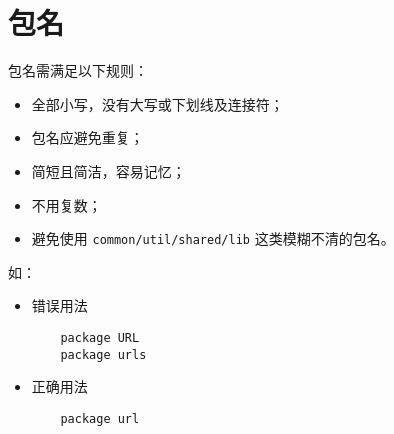 \section{包名}
包名需满足以下规则：
\begin{itemize}[leftmargin=4em]
\item 全部小写，没有大写或下划线及连接符；
\item 包名应避免重复；
\item 简短且简洁，容易记忆；
\item 不用复数；
\item 避免使用 \texttt{common/util/shared/lib} 这类模糊不清的包名。
\end{itemize}

如：
\begin{itemize}[leftmargin=4em]
\item 错误用法

  \begin{verbatim}
    package URL
    package urls
  \end{verbatim}
\item 正确用法

  \begin{verbatim}
    package url
  \end{verbatim}
\end{itemize}

